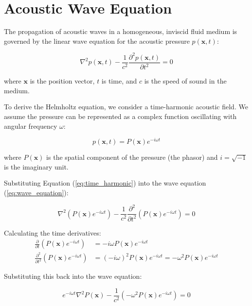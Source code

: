 \section{Acoustic Wave Equation}\label{sec:acoustic-helmholtz}

The propagation of acoustic waves in a homogeneous, inviscid fluid medium is governed by the linear wave equation for the acoustic pressure $p(\mathbf{x}, t)$:

\begin{equation}
    \nabla^2 p(\mathbf{x}, t) - \frac{1}{c^2} \frac{\partial^2 p(\mathbf{x}, t)}{\partial t^2} = 0
    \label{eq:wave_equation}
\end{equation}

where $\mathbf{x}$ is the position vector, $t$ is time, and $c$ is the speed of sound in the medium.

To derive the Helmholtz equation, we consider a time-harmonic acoustic field. We assume the pressure can be represented as a complex function oscillating with angular frequency $\omega$:

\begin{equation}
    p(\mathbf{x}, t) = P(\mathbf{x}) e^{-i \omega t}
    \label{eq:time_harmonic}
\end{equation}

where $P(\mathbf{x})$ is the spatial component of the pressure (the phasor) and $i = \sqrt{-1}$ is the imaginary unit.

Substituting Equation (\ref{eq:time_harmonic}) into the wave equation (\ref{eq:wave_equation}):

\begin{equation}
    \nabla^2 \left( P(\mathbf{x}) e^{-i \omega t} \right) - \frac{1}{c^2} \frac{\partial^2}{\partial t^2} \left( P(\mathbf{x}) e^{-i \omega t} \right) = 0
\end{equation}

Calculating the time derivatives:
\begin{align}
    \frac{\partial}{\partial t} \left( P(\mathbf{x}) e^{-i \omega t} \right) &= -i \omega P(\mathbf{x}) e^{-i \omega t} \\
    \frac{\partial^2}{\partial t^2} \left( P(\mathbf{x}) e^{-i \omega t} \right) &= (-i \omega)^2 P(\mathbf{x}) e^{-i \omega t} = -\omega^2 P(\mathbf{x}) e^{-i \omega t}
\end{align}

Substituting this back into the wave equation:

\begin{equation}
    e^{-i \omega t} \nabla^2 P(\mathbf{x}) - \frac{1}{c^2} (-\omega^2 P(\mathbf{x}) e^{-i \omega t}) = 0
\end{equation}

